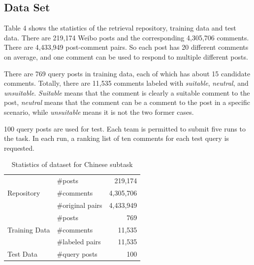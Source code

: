 \documentclass{sig-alternate}
\begin{document}
\subsection{Data Set}
Table 4 shows the statistics of the retrieval repository, training
data and test data. There are 219,174 Weibo posts and the
corresponding 4,305,706 comments. There are 4,433,949 post-comment
pairs. So each post has 20 different comments on
average, and one comment can be used to respond to multiple
different posts. 

There are 769 query posts in training data, each of which has about 15 
candidate comments. Totally, there are 11,535 comments labeled with 
\emph{suitable}, \emph{neutral}, and \emph{unsuitable}. \emph{Suitable} means that the comment 
is clearly a suitable comment to the post, \emph{neutral} means that the comment 
can be a comment to the post in a specific scenario, while \emph{unsuitable} means 
it is not the two former cases. 

100 query posts are used for test. Each team is permitted to submit five
runs to the task. In each run, a ranking list of ten comments for
each test query is requested. 

\begin{table}
\centering
\caption{Statistics of dataset for Chinese subtask}
\label{my-label}
\begin{minipage}{\columnwidth}
\begin{center}
\begin{tabular}{|l@{\quad}|l@{\quad}|@{\quad}r|}
\hline
\multirow{3}{*}{Repository}
                  & \#posts           & 219,174   \\ \cline{2-3} 
                  & \#comments        & 4,305,706 \\ \cline{2-3} 
                  & \#original pairs  & 4,433,949 \\ \hline
\multirow{3}{*}{Training Data} 
                  & \#posts           & 769       \\ \cline{2-3} 
                  & \#comments        & 11,535    \\ \cline{2-3} 
                  & \#labeled pairs   & 11,535    \\ \hline
Test Data         & \#query posts     & 100       \\ \hline
\end{tabular}
\end{center}
\end{minipage}
\end{table}
\end{document}
